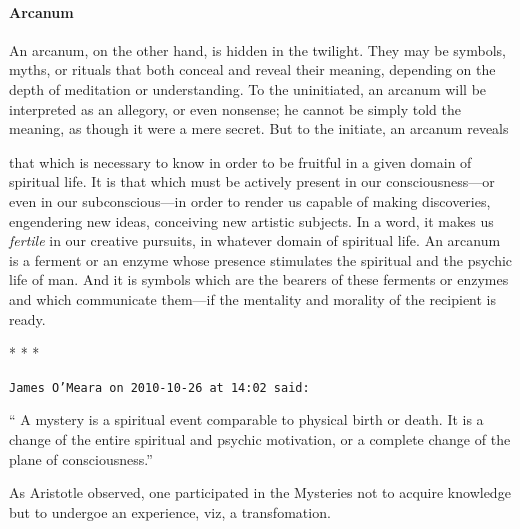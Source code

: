 \paragraph{Arcanum}


An arcanum, on the other hand, is hidden in the twilight. They may be symbols, myths, or rituals that both conceal and reveal their meaning, depending on the depth of meditation or understanding. To the uninitiated, an arcanum will be interpreted as an allegory, or even nonsense; he cannot be simply told the meaning, as though it were a mere secret. But to the initiate, an arcanum reveals

\begin{quotex}
that which is necessary to know in order to be fruitful in a given domain of spiritual life. It is that which must be actively present in our consciousness---or even in our subconscious---in order to render us capable of making discoveries, engendering new ideas, conceiving new artistic subjects. In a word, it makes us \emph{fertile} in our creative pursuits, in whatever domain of spiritual life. An arcanum is a ferment or an enzyme whose presence stimulates the spiritual and the psychic life of man. And it is symbols which are the bearers of these ferments or enzymes and which communicate them---if the mentality and morality of the recipient is ready.
\end{quotex}




\begin{center}* * *\end{center}

\begin{footnotesize}
\begin{sffamily}
\texttt{James O'Meara on 2010-10-26 at 14:02 said:}

`` A mystery is a spiritual event comparable to physical birth or death. It is a change of the entire spiritual and psychic motivation, or a complete change of the plane of consciousness.''

As Aristotle observed, one participated in the Mysteries not to acquire knowledge but to undergoe an experience, viz, a transfomation.

\end{sffamily}
\end{footnotesize}

